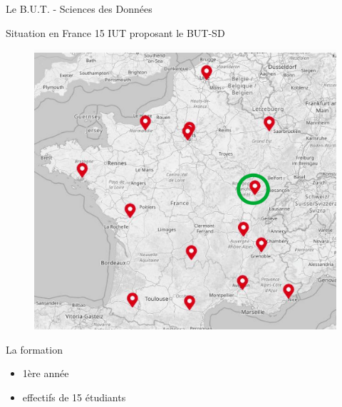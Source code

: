 \documentclass [xcolor=x11names,t] {beamer}
\begin{document}
\begin{frame}{Le B.U.T. - Sciences des Données }
    

\begin{minipage}{0.5\textwidth}
\begin{block}{Situation  en France}
15 IUT proposant le BUT-SD
  
\begin{figure}
    \centering
    \includegraphics[scale=0.3]{img/dole.png}
\end{figure}
\end{block}
\end{minipage}\hfill
\begin{minipage}{0.45\textwidth}
\begin{block}{La formation}

     \begin{itemize}
        \item 1ère année
        \item effectifs de 15 étudiants
    \end{itemize}



\end{block}
\end{minipage}
\end{frame}
\end{document}
